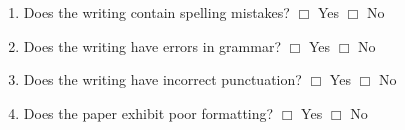 \documentclass[letterpaper, 10pt]{article} %
\begin{document}
{\begin{enumerate}
\begin{itemize}
\item Summary section

\item Evaluation section

\item Synthesis section

\item Article abstract

\item Introduction section

\item Related work section

\item Description of technique 

\item Future work section

\item Conclusion section

\item Comprehensive list of references 

\item Technical diagrams

\item Equations and/or other mathematical notation

\item Statement of hypothesis or research question(s)

\item Other types of deliverables

\end{itemize} \vspace*{-.05in}

\item Does the writing contain spelling mistakes? \hspace*{.05in}
  $\Box$ Yes \hspace*{.05in} $\Box$ No

\item Does the writing have errors in grammar? \hspace*{.05in}
  $\Box$ Yes \hspace*{.05in} $\Box$ No

\item Does the writing have incorrect punctuation? \hspace*{.05in}
  $\Box$ Yes \hspace*{.05in} $\Box$ No

\item Does the paper exhibit poor formatting? \hspace*{.05in}
  $\Box$ Yes \hspace*{.05in} $\Box$ No


\end{enumerate}}
\end{document}
